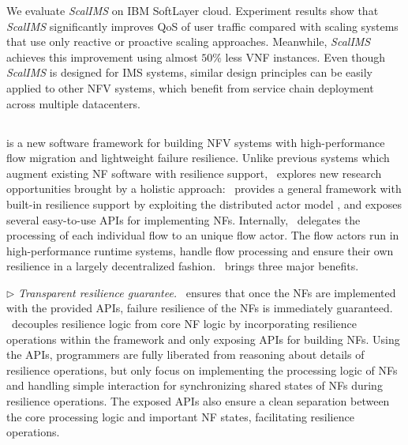 We evaluate \textit{ScalIMS} on IBM SoftLayer cloud. Experiment results show that \textit{ScalIMS} significantly improves QoS of user traffic compared with scaling systems that use only reactive or proactive scaling approaches. Meanwhile, \textit{ScalIMS} achieves this improvement %
 using almost $50\%$ less VNF instances. %
Even though \textit{ScalIMS} is designed for IMS systems, similar design principles can be easily applied to other NFV systems, which benefit from service chain deployment across multiple datacenters.

\subsection{\nfactor}

\nfactor is a new software framework for building NFV systems with high-performance flow migration and lightweight failure resilience. Unlike previous systems \cite{sherry2015rollback, rajagopalan2013pico, rajagopalan2013split, gember2015opennf} which augment existing NF software with resilience support, \nfactor~explores new research opportunities brought by a holistic approach: \nfactor~provides a general framework with built-in resilience support by exploiting the distributed actor model \cite{actor-wiki}, and exposes several easy-to-use APIs for implementing NFs. Internally, \nfactor~delegates the processing of each individual flow to an unique flow actor. The flow actors run in high-performance runtime systems, handle flow processing and ensure their own resilience in a largely decentralized fashion. \nfactor~brings three major benefits.

$\triangleright$ {\em Transparent resilience guarantee.} \nfactor~ensures that once the NFs are implemented with the provided APIs, failure resilience of the NFs is immediately guaranteed. \nfactor~decouples resilience logic from core NF logic by incorporating resilience operations within the framework and only exposing APIs for building NFs. Using the APIs, programmers are fully liberated from reasoning about details of resilience operations, but only focus on implementing the processing logic of NFs and handling simple interaction for synchronizing shared states of NFs during resilience operations. The exposed APIs also ensure a clean separation between the core processing logic and important NF states, facilitating resilience operations.

